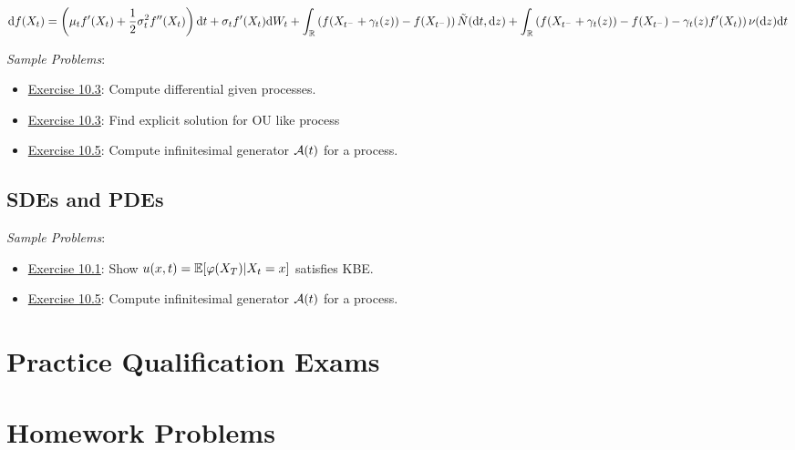 \documentclass[12pt]{article}
\begin{document}
\begin{align*}
    \mathrm{d} f(X_t) = \left( \mu_t f'(X_t) + \frac{1}{2} \sigma_t^2 f''(X_t) \right) \mathrm{d} t + \sigma_t f'(X_t) \mathrm{d} W_t
    + \int_{\mathbb{R}} \left( f(X_{t^-}+\gamma_t(z)) - f(X_{t^-}) \right) \tilde{N}(\mathrm{d} t, \mathrm{d} z)
    + \int_{\mathbb{R}} \left( f(X_{t^-}+\gamma_t(z)) - f(X_{t^-}) - \gamma_t(z) f'(X_t) \right)\nu(\mathrm{d} z)\mathrm{d} t
\end{align*}

\textit{Sample Problems}:
\begin{itemize}[nolistsep]
    \item \hyperref[Exercise 10.3]{Exercise 10.3}: Compute differential given processes.
    \item \hyperref[Exercise 10.3]{Exercise 10.3}: Find explicit solution for OU like process
    \item \hyperref[Exercise 10.5]{Exercise 10.5}: Compute infinitesimal generator \( \mathcal{A}(t) \) for a process.
\end{itemize}




\subsection{SDEs and PDEs}


\textit{Sample Problems}:
\begin{itemize}[nolistsep]
    \item \hyperref[Exercise 10.1]{Exercise 10.1}: Show \( u(x,t) = \mathbb{E}[\varphi(X_T)|X_t=x] \) satisfies KBE.
    \item \hyperref[Exercise 10.5]{Exercise 10.5}: Compute infinitesimal generator \( \mathcal{A}(t) \) for a process.
\end{itemize}



\pagebreak
\section{Practice Qualification Exams}


\pagebreak
\section{Homework Problems}








\end{document}
